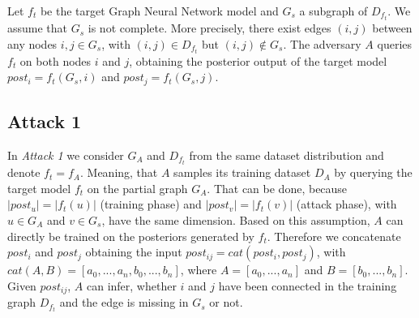     Let $f_t$ be the target Graph Neural Network model and $G_s$ a subgraph of $D_{f_t}$.
    We assume that $G_s$ is not complete. 
    More precisely, there exist edges $(i,j)$ between any nodes $i,j \in G_s$, with $(i,j) \in D_{f_t}$ but $(i,j) \not\in G_s$.
    The adversary $A$ queries $f_t$ on both nodes $i$ and $j$, obtaining the posterior output of the target model $post_i = f_t(G_s, i)$ and $post_j = f_t(G_s, j)$.

    \subsection*{Attack 1}
    \label{section:attack1}
      In \emph{Attack 1} we consider $G_A$ and $D_{f_t}$ from the same dataset distribution and denote $f_t = f_A$.
      Meaning, that $A$ samples its training dataset $D_A$ by querying the target model $f_t$ on the partial graph $G_A$.
      That can be done, because $|post_u| = |f_t(u)|$ (training phase) and $|post_v| = |f_t(v)|$ (attack phase), with $u \in G_A$ and $v \in G_s$, have the same dimension.
      Based on this assumption, $A$ can directly be trained on the posteriors generated by $f_t$.
      Therefore we concatenate $post_i$ and $post_j$ obtaining the input $post_{ij} = cat(post_i, post_j)$, with $cat(A,B) = [a_0,...,a_n,b_0,...,b_n]$, where $A = [a_0,...,a_n]$ and $B = [b_0,...,b_n]$. 
      Given $post_{ij}$, $A$ can infer, whether $i$ and $j$ have been connected in the training graph $D_{f_t}$ and the edge is missing in $G_s$ or not.

